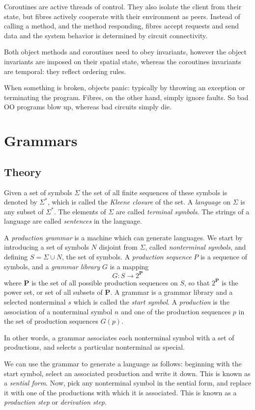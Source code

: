 \documentclass[oneside]{book}
\begin{document}
Coroutines are active threads of control. They also isolate
the client from their state, but fibres actively cooperate
with their environment as peers. Instead of calling a method,
and the method responding, fibres accept requests and send
data and the system behavior is determined by circuit connectivity.

Both object methods and coroutines need to obey invariants,
however the object invariants are imposed on their spatial
state, whereas the coroutines invariants are temporal:
they reflect ordering rules.

When something is broken, objects panic: typically by throwing
an exception or terminating the program. Fibres, on the other
hand, simply ignore faults. So bad OO programs blow up,
whereas bad circuits simply die.

\chapter{Grammars}
\section{Theory}
Given a set of symbols $\Sigma$ the set of all finite sequences of
these symbols is denoted by $\Sigma^\ast$, which is called the
{\em Kleene closure} of the set. A {\em language} on $\Sigma$ is any
subset of $\Sigma^\ast$. The elements of $\Sigma$ are called
{\em terminal symbols}. The strings of a language are called
{\em sentences} in the language.

A {\em production grammar} is a machine which can generate languages.
We start by introducing a set of symbols $N$ disjoint from $\Sigma$, called
{\em nonterminal symbols}, and defining $S=\Sigma\cup N$,
the set of symbols. A {\em production sequence} $P$ is a sequence of symbols, 
and a {\em grammar library} $G$ is a mapping $$G: S\rightarrow 2^{\mathbf P}$$ where $\mathbf P$ is the
set of all possible production sequences on $S$, so that $2^{\mathbf P}$ is the power set,
or set of all subsets of $\mathbf P$. A grammar is a grammar library and a 
selected nonterminal $s$ which is called the {\em start symbol}.
A {\em production} is the association of a nonterminal symbol $n$ and one
of the production sequences $p$ in the set of production sequences $G(p)$.

In other words, a grammar associates each nonterminal symbol with a set
of productions, and selects a particular nonterminal as special. 

We can use the grammar to generate a language as follows: beginning with
the start symbol, select an associated production and write it down.
This is known as a {\em sential form}. Now, pick any nonterminal symbol
in the sential form, and replace it with one of the productions with
which it is associated. This is known as a {\em production step}
or {\em derivation step.}
\end{document}
